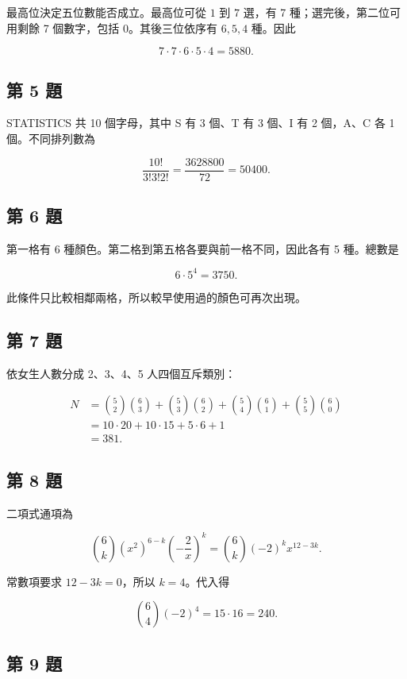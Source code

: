 \documentclass[11pt,a4paper]{article}
\begin{document}
最高位決定五位數能否成立。最高位可從 \(1\) 到 \(7\) 選，有 7 種；選完後，第二位可用剩餘 7 個數字，包括 0。其後三位依序有 \(6,5,4\) 種。因此

\[
7\cdot7\cdot6\cdot5\cdot4=5880.
\]

\subsection{第 5 題}\label{ux7b2c-5-ux984c}

STATISTICS 共 10 個字母，其中 S 有 3 個、T 有 3 個、I 有 2 個，A、C 各 1 個。不同排列數為

\[
\frac{10!}{3!3!2!}
=\frac{3628800}{72}
=50400.
\]

\subsection{第 6 題}\label{ux7b2c-6-ux984c}

第一格有 6 種顏色。第二格到第五格各要與前一格不同，因此各有 5 種。總數是

\[
6\cdot5^4=3750.
\]

此條件只比較相鄰兩格，所以較早使用過的顏色可再次出現。

\subsection{第 7 題}\label{ux7b2c-7-ux984c}

依女生人數分成 2、3、4、5 人四個互斥類別：

\[
\begin{aligned}
N
&=\binom52\binom63+\binom53\binom62
 +\binom54\binom61+\binom55\binom60\\
&=10\cdot20+10\cdot15+5\cdot6+1\\
&=381.
\end{aligned}
\]

\subsection{第 8 題}\label{ux7b2c-8-ux984c}

二項式通項為

\[
\binom6k(x^2)^{6-k}\left(-\frac2x\right)^k
=\binom6k(-2)^k x^{12-3k}.
\]

常數項要求 \(12-3k=0\)，所以 \(k=4\)。代入得

\[
\binom64(-2)^4=15\cdot16=240.
\]

\subsection{第 9 題}\label{ux7b2c-9-ux984c}
\end{document}
